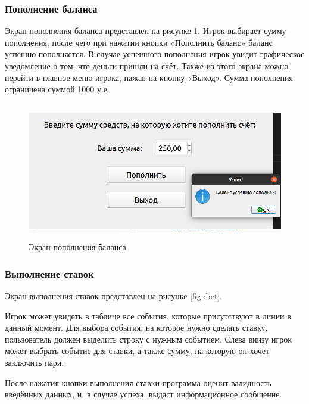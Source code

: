 \subsubsection{Пополнение баланса}
Экран пополнения баланса представлен на рисунке \ref{fig::balance}. 
Игрок выбирает сумму пополнения, после чего при нажатии кнопки «Пополнить баланс» баланс успешно пополняется. 
В случае успешного пополнения игрок увидит графическое уведомление о том, что деньги пришли на счёт.
Также из этого экрана можно перейти в главное меню игрока, нажав на кнопку «Выход». 
Сумма пополнения ограничена суммой 1000 у.е. 

\FloatBarrier
\begin{figure}[h]	
	\begin{center}
		\includegraphics[height = 6cm, width=\linewidth]{inc/balance.png}
	\end{center}
	\captionsetup{justification=centering, labelsep=defffis}
	\caption{Экран пополнения баланса}
	\label{fig::balance}
\end{figure}
\FloatBarrier

\subsubsection{Выполнение ставок}
Экран выполнения ставок представлен на рисунке \ref{fig::bet}.

Игрок может увидеть в таблице все события, которые присутствуют в линии в данный момент.
Для выбора события, на которое нужно сделать ставку, пользователь должен выделить строку с нужным событием.
Слева внизу игрок может выбрать событие для ставки, а также сумму, на которую он хочет заключить пари.

После нажатия кнопки выполнения ставки программа оценит валидность введённых данных, и, в случае успеха, выдаст информационное сообщение.

